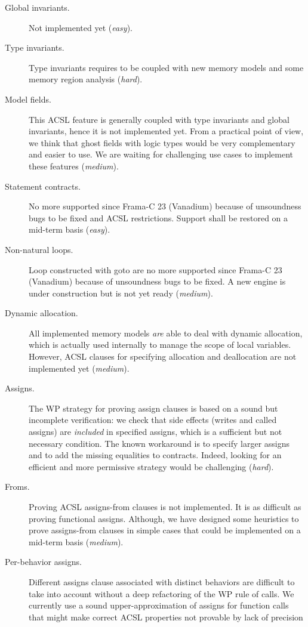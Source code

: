 \begin{description}
\item[Global invariants.]
Not implemented yet (\textit{easy}).
\item[Type invariants.]
Type invariants requires to be coupled with new memory models and
some memory region analysis (\textit{hard}).
\item[Model fields.]
This \textsf{ACSL} feature is generally coupled with type invariants and global invariants, hence it is not implemented yet. From a practical point
of view, we think that ghost fields with logic types would be very complementary and easier to use. We are waiting for challenging use cases
to implement these features (\textit{medium}).
\item[Statement contracts.]
No more supported since \textsf{Frama-C 23} (Vanadium) because of
unsoundness bugs to be fixed and \textsf{ACSL} restrictions.
Support shall be restored on a mid-term basis (\textit{easy}).
\item[Non-natural loops.]
Loop constructed with \textsf{goto} are no more supported since
\textsf{Frama-C 23} (Vanadium) because of unsoundness bugs to be fixed.
A new engine is under construction but is not yet ready (\textit{medium}).
\item[Dynamic allocation.]
All implemented memory models \emph{are} able to deal with dynamic allocation,
which is actually used internally to manage the scope of local variables.
However, \textsf{ACSL} clauses for specifying allocation and deallocation
are not implemented yet (\textit{medium}).
\item[Assigns.]
The WP strategy for proving assign clauses is based on a sound but incomplete verification: we check that side effects
(writes and called assigns) are \emph{included} in specified assigns, which
is a sufficient but not necessary condition. The known workaround is to
specify larger assigns and to add the missing equalities to contracts.
Indeed, looking for an efficient and more permissive strategy would be challenging (\textit{hard}).
\item[Froms.]
Proving \textsf{ACSL} assigns-from clauses is not implemented. It is as difficult as proving functional assigns. Although, we have designed some
heuristics to prove assigns-from clauses in simple cases that could be implemented on a mid-term basis (\textit{medium}).
\item[Per-behavior assigns.]
Different assigns clause associated with distinct behaviors are difficult to
take into account without a deep refactoring of the WP rule of calls. We currently use a sound upper-approximation of assigns for function calls that might make correct \textsf{ACSL} properties not provable by lack of precision

\end{description}

